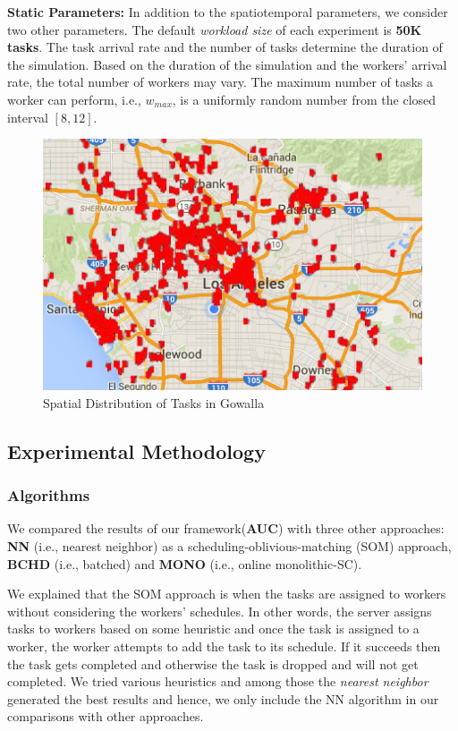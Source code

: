 \noindent \textbf{Static Parameters:} In addition to the spatiotemporal parameters, we consider two other parameters. The default \emph{workload size} of each experiment is \textbf{50K tasks}. The task arrival rate and the number of tasks determine the duration of the simulation. Based on the duration of the simulation and the workers' arrival rate, the total number of workers may vary. The maximum number of tasks a worker can perform, i.e., $w_{max}$, is a uniformly random number from the closed interval \boldmath$\left[8,12 \right]$.

\begin{figure}[h]
	\centering
	\includegraphics[scale=0.35]{figures/la_flickr.jpg}
	\caption{Spatial Distribution of Tasks in Gowalla}\label{fig:la_gowalla}
\end{figure}

\vspace{-0.05in}
\subsection{Experimental Methodology}
\label{subsec:exp_setup}
\vspace{-0.05in}
\subsubsection{Algorithms}
We compared the results of our framework(\textbf{AUC}) with three other approaches: \textbf{NN} (i.e., nearest neighbor) as a scheduling-oblivious-matching (SOM) approach, \textbf{BCHD} (i.e., batched) and \textbf{MONO} (i.e., online monolithic-SC).

We explained that the SOM approach is when the tasks are assigned to workers without considering the workers' schedules. In other words, the server assigns tasks to workers based on some heuristic and once the task is assigned to a worker, the worker attempts to add the task to its schedule. If it succeeds then the task gets completed and otherwise the task is dropped and will not get completed. We tried various heuristics and among those the \textit{nearest neighbor} generated the best results and hence, we only include the NN algorithm in our comparisons with other approaches.


